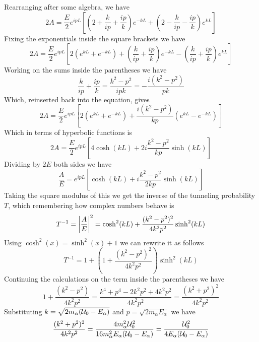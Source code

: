\documentclass[../qm.tex]{subfiles}
\begin{document}
Rearranging after some algebra, we have
\begin{equation*}
	2A=\frac{E}{2}e^{ipL}\left[ \left( 2+\frac{k}{ip}+\frac{ip}{k} \right)e^{-kL}+\left( 2-\frac{k}{ip}-\frac{ip}{k} \right)e^{kL} \right]
\end{equation*}
Fixing the exponentials inside the square brackets we have
\begin{equation*}
	2A=\frac{E}{2}e^{ipL}\left[ 2\left( e^{kL}+e^{-kL} \right)+\left( \frac{k}{ip}+\frac{ip}{k} \right)e^{-kL}-\left( \frac{k}{ip}+\frac{ip}{k} \right)e^{kL} \right]
\end{equation*}
Working on the sums inside the parentheses we have
\begin{equation*}
	\frac{k}{ip}+\frac{ip}{k}=\frac{k^2-p^2}{ipk}=-\frac{i\left(k^2-p^2\right)}{pk}
\end{equation*}
Which, reinserted back into the equation, gives
\begin{equation*}
	2A=\frac{E}{2}e^{ipL}\left[ 2\left( e^{kL}+e^{-kL} \right)+\frac{i(k^2-p^2)}{kp}\left( e^{kL}-e^{-kL} \right) \right]
\end{equation*}
Which in terms of hyperbolic functions is
\begin{equation*}
	2A=\frac{E}{2}e^{ipL}\left[ 4\cosh(kL)+2i\frac{k^2-p^2}{kp}\sinh(kL) \right]
\end{equation*}
Dividing by $2E$ both sides we have
\begin{equation*}
	\frac{A}{E}=e^{ipL}\left[ \cosh(kL)+i\frac{k^2-p^2}{2kp}\sinh(kL) \right]
\end{equation*}
Taking the square modulus of this we get the inverse of the tunneling probability $T$, which remembering how complex numbers behave is
\begin{equation*}
	T^{-1}=\abs{\frac{A}{E}}^2=\cosh^2(kL)+\frac{(k^2-p^2)^2}{4k^2p^2}\sinh^2(kL)
\end{equation*}
Using $\cosh^2(x)=\sinh^2(x)+1$ we can rewrite it as follows
\begin{equation}
	T^{-1}=1+\left( 1+\frac{(k^2-p^2)^2}{4k^2p^2} \right)\sinh^2(kL)
	\label{eq:inversetunnelprob}
\end{equation}
Continuing the calculations on the term inside the parentheses we have
\begin{equation*}
	1+\frac{(k^2-p^2)}{4k^2p^2}=\frac{k^4+p^4-2k^2p^2+4k^2p^2}{4k^2p^2}=\frac{\left( k^2+p^2 \right)^2}{4k^2p^2}
\end{equation*}
Substituting $k=\sqrt{2m_\alpha(\mathcal{U}_0-E_\alpha)}$ and $p=\sqrt{2m_\alpha E_\alpha}$ we have
\begin{equation*}
	\frac{(k^2+p^2)^2}{4k^2p^2}=\frac{4m_\alpha^2\mathcal{U}_0^2}{16m_\alpha^2E_\alpha(\mathcal{U}_0-E_\alpha)}=\frac{\mathcal{U}_0^2}{4E_\alpha(\mathcal{U}_0-E_\alpha)}
\end{equation*}
\end{document}
